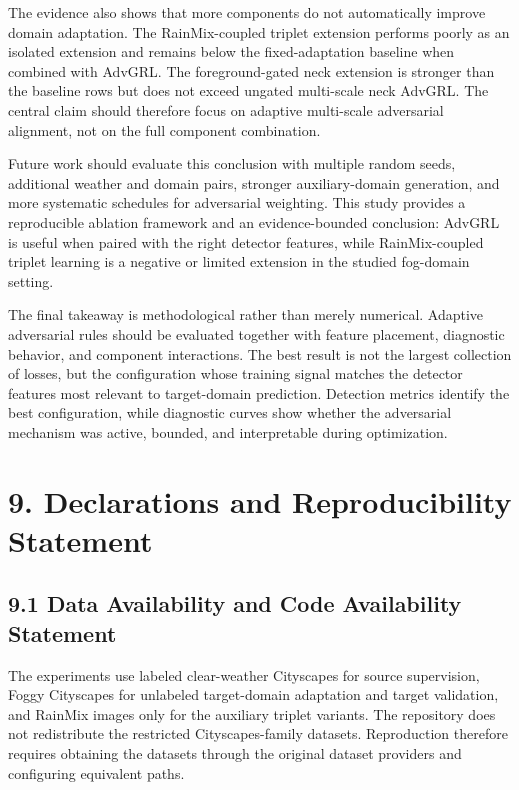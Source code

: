 \documentclass[
  11pt,
]{article}
\begin{document}
The evidence also shows that more components do not automatically
improve domain adaptation. The RainMix-coupled triplet extension
performs poorly as an isolated extension and remains below the
fixed-adaptation baseline when combined with AdvGRL. The
foreground-gated neck extension is stronger than the baseline rows but
does not exceed ungated multi-scale neck AdvGRL. The central claim
should therefore focus on adaptive multi-scale adversarial alignment,
not on the full component combination.

Future work should evaluate this conclusion with multiple random seeds,
additional weather and domain pairs, stronger auxiliary-domain
generation, and more systematic schedules for adversarial weighting.
This study provides a reproducible ablation framework and an
evidence-bounded conclusion: AdvGRL is useful when paired with the right
detector features, while RainMix-coupled triplet learning is a negative
or limited extension in the studied fog-domain setting.

The final takeaway is methodological rather than merely numerical.
Adaptive adversarial rules should be evaluated together with feature
placement, diagnostic behavior, and component interactions. The best
result is not the largest collection of losses, but the configuration
whose training signal matches the detector features most relevant to
target-domain prediction. Detection metrics identify the best
configuration, while diagnostic curves show whether the adversarial
mechanism was active, bounded, and interpretable during optimization.

\hypertarget{declarations-and-reproducibility-statement}{%
\section{9. Declarations and Reproducibility
Statement}\label{declarations-and-reproducibility-statement}}

\hypertarget{data-availability-and-code-availability-statement}{%
\subsection{9.1 Data Availability and Code Availability
Statement}\label{data-availability-and-code-availability-statement}}

The experiments use labeled clear-weather Cityscapes for source
supervision, Foggy Cityscapes for unlabeled target-domain adaptation and
target validation, and RainMix images only for the auxiliary triplet
variants. The repository does not redistribute the restricted
Cityscapes-family datasets. Reproduction therefore requires obtaining
the datasets through the original dataset providers and configuring
equivalent paths.
\end{document}
